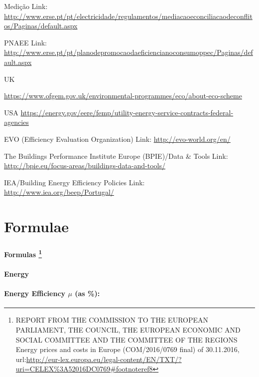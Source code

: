 \documentclass[]{book}
\let\rmarkdownfootnote\footnote%
\def\footnote{\protect\rmarkdownfootnote}
\theoremstyle{definition}
\theoremstyle{definition}
\theoremstyle{definition}
\theoremstyle{remark}
\begin{document}
Medição Link:
\url{http://www.erse.pt/pt/electricidade/regulamentos/mediacaoeconciliacaodeconflitos/Paginas/default.aspx}

PNAEE Link:
\url{http://www.erse.pt/pt/planodepromocaodaeficiencianoconsumoppec/Paginas/default.aspx}

UK

\url{https://www.ofgem.gov.uk/environmental-programmes/eco/about-eco-scheme}

USA
\url{https://energy.gov/eere/femp/utility-energy-service-contracts-federal-agencies}

EVO (Efficiency Evaluation Organization) Link:
\url{http://evo-world.org/en/}

The Buildings Performance Institute Europe (BPIE)/Data \& Tools Link:
\url{http://bpie.eu/focus-areas/buildings-data-and-tools/}

IEA/Building Energy Efficiency Policies Link:
\url{http://www.iea.org/beep/Portugal/}

\chapter{Formulae}\label{formulae}

\subsection{}\label{section}

\subsubsection[Formulas ]{\texorpdfstring{Formulas \footnote{REPORT FROM
  THE COMMISSION TO THE EUROPEAN PARLIAMENT, THE COUNCIL, THE EUROPEAN
  ECONOMIC AND SOCIAL COMMITTEE AND THE COMMITTEE OF THE REGIONS Energy
  prices and costs in Europe (COM/2016/0769 final) of 30.11.2016,
  url:\url{http://eur-lex.europa.eu/legal-content/EN/TXT/?uri=CELEX\%3A52016DC0769\#footnoteref8}}}{Formulas }}\label{anchor}

\subsubsection{Energy}\label{anchor}

\subsubsection{\texorpdfstring{Energy Efficiency \(\mu\) (as
\%):}{Energy Efficiency \textbackslash{}mu (as \%):}}\label{energy-efficiency-mu-as}
\end{document}
